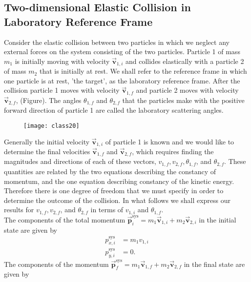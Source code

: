 \subsection{ Two-dimensional Elastic Collision in Laboratory Reference Frame}
Consider the elastic collision between two particles in which we neglect any external forces on the system consisting of the two particles. Particle 1 of mass $m_{1}$ is initially moving with velocity $\overrightarrow{\mathbf{v}}_{1, i}$ and collides elastically with a particle 2 of mass $m_{2}$ that is initially at rest. We shall refer to the reference frame in which one particle is at rest, 'the target', as the laboratory reference frame. After the collision particle 1 moves with velocity $\overrightarrow{\mathbf{v}}_{1, f}$ and particle 2 moves with velocity $\overrightarrow{\mathbf{v}}_{2, f}$, (Figure). The angles $\theta_{1, f}$ and $\theta_{2, f}$ that the particles make with the positive forward direction of particle 1 are called the laboratory scattering angles.\\
\begin{figure}[H]
	\centering
	\texttt{[image: class20]}
	\caption{}
	\label{}
\end{figure}
Generally the initial velocity $\overrightarrow{\mathbf{v}}_{1, i}$ of particle 1 is known and we would like to determine the final velocities $\overrightarrow{\mathbf{v}}_{1, f}$ and $\overrightarrow{\mathbf{v}}_{2, f}$, which requires finding the magnitudes and directions of each of these vectors, $v_{1, f}, v_{2, f}, \theta_{1, f}$, and $\theta_{2, f} .$ These quantities are related by the two equations describing the constancy of momentum, and the one equation describing constancy of the kinetic energy. Therefore there is one degree of freedom that we must specify in order to determine the outcome of the collision. In what follows we shall express our results for $v_{1, f}, v_{2, f}$, and $\theta_{2, f}$ in terms of $v_{1, i}$ and $\theta_{1, f}$.\\
The components of the total momentum $\overrightarrow{\mathbf{p}}_{i}^{\mathrm{sys}}=m_{1} \overrightarrow{\mathbf{v}}_{1, i}+m_{2} \overrightarrow{\mathbf{v}}_{2, i}$ in the initial state are given by
$$
\begin{aligned}
p_{x, i}^{\mathrm{sys}} &=m_{1} v_{1, i} \\
p_{y, i}^{\mathrm{sys}} &=0 .
\end{aligned}
$$
The components of the momentum $\overrightarrow{\mathbf{p}}_{f}^{\mathrm{sys}}=m_{1} \overrightarrow{\mathbf{v}}_{1, f}+m_{2} \overrightarrow{\mathbf{v}}_{2, f}$ in the final state are given by

